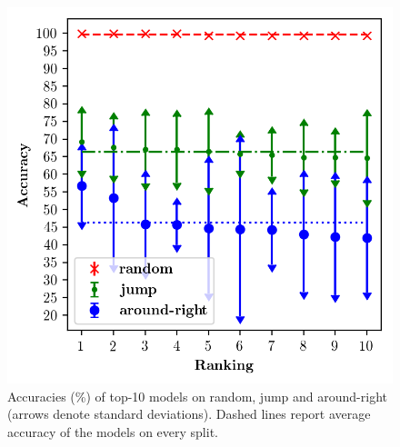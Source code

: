 
\begin{figure}[tb]
    \includegraphics[width=.5\textwidth,keepaspectratio]{figures/accuracies_all_splits.png}
    \centering
    \caption{Accuracies (\%) of top-10 models on random, jump and around-right (arrows
      denote standard deviations). Dashed lines report average accuracy
      of the models on every split.
      }
    \label{fig:exp1}
\end{figure}

